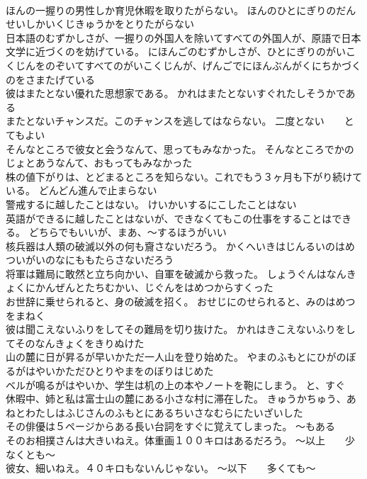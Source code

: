 \documentclass[8pt]{extreport}
\begin{document}
\begin{CJK}{UTF8}{min}
\\	ほんの一握りの男性しか育児休暇を取りたがらない。	ほんのひとにぎりのだんせいしかいくじきゅうかをとりたがらない 
\\	日本語のむずかしさが、一握りの外国人を除いてすべての外国人が、原語で日本文学に近づくのを妨げている。	にほんごのむずかしさが、ひとにぎりのがいこくじんをのぞいてすべてのがいこくじんが、げんごでにほんぶんがくにちかづくのをさまたげている 
\\	彼はまたとない優れた思想家である。	かれはまたとないすぐれたしそうかである 
\\	またとないチャンスだ。このチャンスを逃してはならない。	二度とない　　とてもよい
\\	そんなところで彼女と会うなんて、思ってもみなかった。	そんなところでかのじょとあうなんて、おもってもみなかった 
\\	株の値下がりは、とどまるところを知らない。これでもう３ヶ月も下がり続けている。	どんどん進んで止まらない
\\	警戒するに越したことはない。	けいかいするにこしたことはない 
\\	英語ができるに越したことはないが、できなくてもこの仕事をすることはできる。	どちらでもいいが、まあ、～するほうがいい
\\	核兵器は人類の破滅以外の何も齎さないだろう。	かくへいきはじんるいのはめついがいのなにももたらさないだろう 
\\	将軍は難局に敢然と立ち向かい、自軍を破滅から救った。	しょうぐんはなんきょくにかんぜんとたちむかい、じぐんをはめつからすくった 
\\	お世辞に乗せられると、身の破滅を招く。	おせじにのせられると、みのはめつをまねく 
\\	彼は聞こえないふりをしてその難局を切り抜けた。	かれはきこえないふりをしてそのなんきょくをきりぬけた 
\\	山の麓に日が昇るが早いかただ一人山を登り始めた。	やまのふもとにひがのぼるがはやいかただひとりやまをのぼりはじめた 
\\	ベルが鳴るがはやいか、学生は机の上の本やノートを鞄にしまう。	と、すぐ
\\	休暇中、姉と私は富士山の麓にある小さな村に滞在した。	きゅうかちゅう、あねとわたしはふじさんのふもとにあるちいさなむらにたいざいした 
\\	その俳優は５ページからある長い台詞をすぐに覚えてしまった。	～もある
\\	そのお相撲さんは大きいねえ。体重画１００キロはあるだろう。	～以上　　少なくとも～
\\	彼女、細いねえ。４０キロもないんじゃない。	～以下　　多くても～

\end{CJK}
\end{document}
